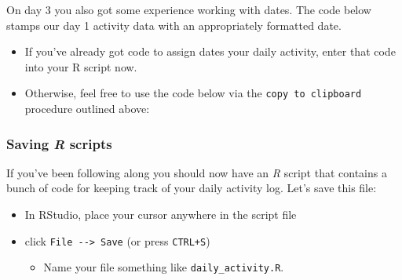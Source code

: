 \documentclass[
]{book}
\newenvironment{Shaded}{\begin{snugshade}}{\end{snugshade}}
\newcommand{\CommentTok}[1]{\textcolor[rgb]{0.56,0.35,0.01}{\textit{#1}}}
\newcommand{\DataTypeTok}[1]{\textcolor[rgb]{0.13,0.29,0.53}{#1}}
\newcommand{\KeywordTok}[1]{\textcolor[rgb]{0.13,0.29,0.53}{\textbf{#1}}}
\newcommand{\NormalTok}[1]{#1}
\newcommand{\StringTok}[1]{\textcolor[rgb]{0.31,0.60,0.02}{#1}}
\providecommand{\tightlist}{%
  \setlength{\itemsep}{0pt}\setlength{\parskip}{0pt}}
\begin{document}
On day 3 you also got some experience working with dates. The code below stamps our day 1 activity data with an appropriately formatted date.

\begin{itemize}
\item
  If you've already got code to assign dates your daily activity, enter that code into your R script now.
\item
  Otherwise, feel free to use the code below via the \texttt{copy\ to\ clipboard} procedure outlined above:
\end{itemize}

\begin{Shaded}
\end{Shaded}

\hypertarget{saving-r-scripts}{%
\subsubsection*{\texorpdfstring{Saving \emph{R} scripts}{Saving R scripts}}\label{saving-r-scripts}}

If you've been following along you should now have an \emph{R} script that contains a bunch of code for keeping track of your daily activity log. Let's save this file:

\begin{itemize}
\tightlist
\item
  In RStudio, place your cursor anywhere in the script file
\item
  click \texttt{File\ -\/-\textgreater{}\ Save} (or press \texttt{CTRL+S})

  \begin{itemize}
  \tightlist
  \item
    Name your file something like \texttt{daily\_activity.R}.
  \end{itemize}
\end{itemize}
\end{document}
